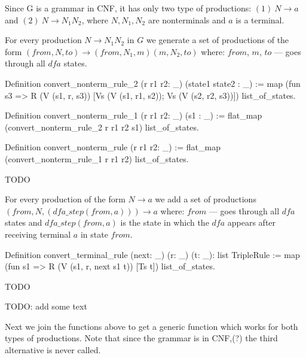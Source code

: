 Since G is a grammar in CNF, it has only two type of productions: $(1)\ N \to a $ and $(2) \ N \to N_{1} N_{2}$, where $N, N_1, N_2$ are nonterminals and $a$ is a terminal.

For every production $N \to N_1 N_2$ in $G$ we generate a set of productions of the form $(from, N, to) \to (from, N_1,  m) (m, N_2, to)$ where: $from$, $m$, $to$ --- goes through all $dfa$ states.

\begin{listing}[h]
	\begin{pyglist}[language=coq, numbers=none, numbersep=5pt]
  Definition convert_nonterm_rule_2 (r r1 r2: _) (state1 state2 : _) :=
    map (fun s3 => R (V (s1, r, s3)) [Vs (V (s1, r1, s2)); Vs (V (s2, r2, s3))])
      list_of_states.

  Definition convert_nonterm_rule_1  (r r1 r2: _) (s1 : _) :=
    flat_map (convert_nonterm_rule_2 r r1 r2 s1) list_of_states.

  Definition convert_nonterm_rule (r r1 r2: _) :=
    flat_map (convert_nonterm_rule_1 r r1 r2) list_of_states.
    \end{pyglist}
	\caption{TODO}
	\label{lst:verbments1}
\end{listing}

For every production of the form $N \to a$ we add a set of productions $(from, N, (dfa\_step(from, a))) \to a$ where: $from$ --- goes through all $dfa$ states and $dfa\_step (from, a)$ is the state in which the $dfa$ appears after receiving terminal $a$ in state $from$.

\begin{listing}[h]
	\begin{pyglist}[language=coq, numbers=none, numbersep=5pt]
  Definition convert_terminal_rule (next: _) (r: _) (t: _): list TripleRule :=
    map (fun s1 => R (V (s1, r, next s1 t)) [Ts t]) list_of_states.
	\end{pyglist}
	\caption{TODO}
	\label{lst:verbments1}
\end{listing}

TODO: add some text 

Next we join the functions above to get a generic function which works for both types of productions. Note that since the grammar is in CNF,(?) the third alternative is never called.


